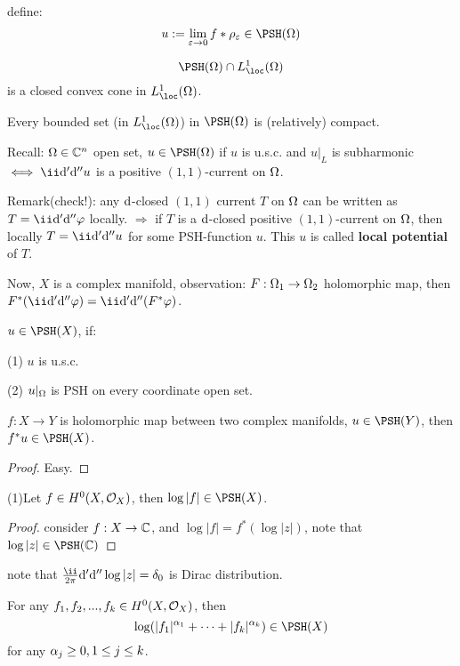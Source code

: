 define:
$$u:=\lim_{\veps\to 0}
f*\rho_\veps\in\PSH(\Omg)
$$

\begin{cor}
$$\PSH(\Omg)\cap L_{\loc}^1(\Omg)$$
is a closed convex cone in $L^1_{\loc}(\Omg)$.

Every bounded set (in $L^1_{\loc}(\Omg)$) in $\PSH(\Omg)$
is (relatively) compact.
\end{cor}


Recall: $\Omega\in\mathbb{C}^n$ open set, 
$u\in\PSH(\Omg)$ if $u$ is u.s.c. and $u|_L$
is subharmonic $\iff\ii\td'\td'' u$ is a positive $(1,1)$-current on $\Omega$.

Remark(check!): any $\mathrm{d}$-closed $(1,1)$ current $T$
on $\Omega$ can be written as $T=\ii\td'\td''\fai$ locally.
$\Rightarrow$ if $T$ is a $\mathrm{d}$-closed positive $(1,1)$-current on $\Omega$,
then locally $T=\ii\td'\td''u$ for some PSH-function $u$.
This $u$ is called \textbf{local potential} of $T$.

Now, $X$ is a complex manifold,
observation: $F:\Omega_1\to\Omega_2$ holomorphic map,
then $F^*(\ii\td'\td''\fai)=\ii\td'\td''(F^*\fai)$.

\begin{definition}
$u\in\PSH(X)$, if:

(1) $u$ is u.s.c.

(2) $u|_\Omega$ is PSH on every coordinate open set. 
\end{definition}

\begin{prop}
$f:X\to Y$ is holomorphic map between two complex manifolds,
$u\in\PSH(Y)$, then $f^*u\in\PSH(X)$.
\end{prop}

\begin{proof}
Easy.
\end{proof}

\begin{example}
(1)Let $f\in H^0(X,\mathcal{O}_X)$, then 
$\log |f|\in\PSH(X)$.
\end{example}

\begin{proof}
consider $f:X\to \mathbb{C}$, and 
$\log|f|=f^*(\log|z|)$, note that 
$\log|z|\in\PSH(\bbC)$
\end{proof}
note that $\frac{\ii}{2\pi}\td'\td''\log|z|=\delta_0$ is Dirac distribution.

\begin{example}For any $f_1,f_2,...,f_k\in H^0(X,\mathcal{O}_X)$, then
$$\log(|f_1|^{\afa_1}+\cdots+|f_k|^{\afa_k})\in\PSH(X)$$
for any $\alpha_j\geq 0,1\leq j\leq k$.
\end{example}

